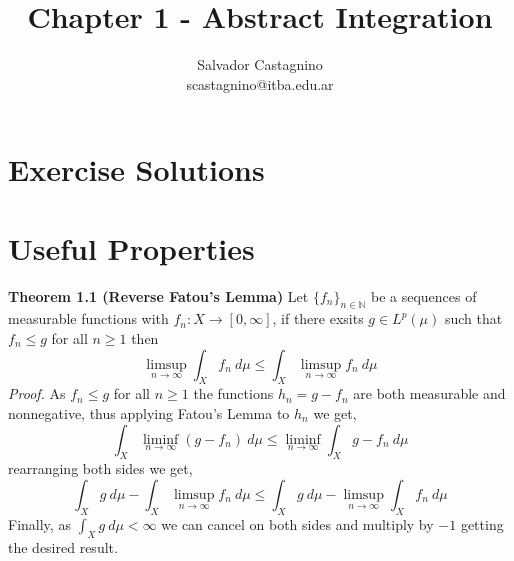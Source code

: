 \documentclass{article}
\author{Salvador Castagnino \\ scastagnino@itba.edu.ar}
\date{}
\title{Chapter 1 - Abstract Integration}
\begin{document}
\maketitle 

\section*{Exercise Solutions}

\section*{Useful Properties}

\begin{theorem}\textbf{Theorem 1.1 (Reverse Fatou's Lemma)}
    Let $\{f_n\}_{n \in \mathbb{N}}$ be a sequences of measurable functions with $f_n : X \rightarrow [0,\infty]$, if there exsits $g \in L^p \left( \mu \right) $ such that $f_n \le g$ for all $n \ge 1$ then 
    \[
        \limsup_{n \to \infty} \int_X f_n\: d\mu \le \int_X \limsup_{n \to \infty} f_n \: d\mu 
    \]
    \textit{Proof.} As $f_n \le g$ for all $n \ge 1$ the functions $h_n = g-f_n$ are both measurable and nonnegative, thus applying Fatou's Lemma to $h_n$ we get,
    \[
        \int_X \liminf_{n \to \infty} \left( g-f_n \right) \: d\mu \le \liminf_{n \to \infty} \int_X g-f_n\: d\mu 
    \]
    rearranging both sides we get,
    \[
        \int_X g\: d\mu - \int_X \limsup_{n \to \infty} f_n\: d\mu \le \int_X g\: d\mu - \limsup_{n \to \infty} \int_X f_n\: d\mu 
    \]
    Finally, as $\int_X g\: d\mu < \infty$ we can cancel on both sides and multiply by $-1$ getting the desired result.
\end{theorem}
\end{document}
